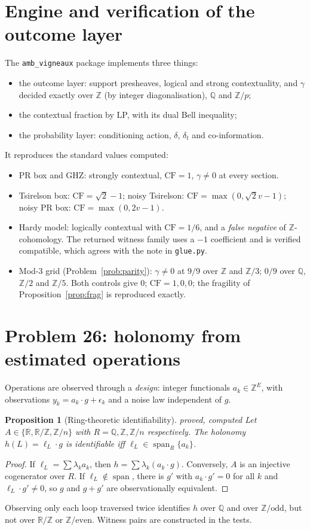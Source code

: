 \documentclass[11pt]{article}
\newtheorem{proposition}[theorem]{Proposition}
\theoremstyle{definition}
\theoremstyle{remark}
\newcommand{\Z}{\mathbb{Z}}
\newcommand{\Q}{\mathbb{Q}}
\newcommand{\R}{\mathbb{R}}
\newcommand{\CF}{\mathrm{CF}}
\newcommand{\st}[1]{\textsf{\small\color{gray}#1}}
\begin{document}
\section{Engine and verification of the outcome layer}\label{sec:engine}
The \texttt{amb\_vigneaux} package implements three things:
\begin{itemize}
  \item the outcome layer: support presheaves, logical and strong contextuality, and $\gamma$ decided exactly over $\Z$ (by integer diagonalisation), $\Q$ and $\Z/p$;
  \item the contextual fraction by LP, with its dual Bell inequality;
  \item the probability layer: conditioning action, $\delta$, $\delta_t$ and co-information.
\end{itemize}
It reproduces the standard values \st{computed}:
\begin{itemize}
  \item PR box and GHZ: strongly contextual, $\CF=1$, $\gamma\ne0$ at every section.
  \item Tsirelson box: $\CF=\sqrt2-1$; noisy Tsirelson: $\CF=\max(0,\sqrt2v-1)$; noisy PR box: $\CF=\max(0,2v-1)$.
  \item Hardy model: logically contextual with $\CF=1/6$, and a \emph{false negative} of $\Z$-cohomology. The returned witness family uses a $-1$ coefficient and is verified compatible, which agrees with the note in \texttt{glue.py}.
  \item Mod-3 grid (Problem~\ref{prob:parity}): $\gamma\ne0$ at $9/9$ over $\Z$ and $\Z/3$; $0/9$ over $\Q$, $\Z/2$ and $\Z/5$. Both controls give $0$; $\CF=1,0,0$; the fragility of Proposition~\ref{prop:frag} is reproduced exactly.
\end{itemize}

\section{Problem 26: holonomy from estimated operations}\label{sec:p26}
Operations are observed through a \emph{design}: integer functionals $a_k\in\Z^E$, with observations $y_k=a_k\cdot g+\epsilon_k$ and a noise law independent of $g$.

\begin{proposition}[Ring-theoretic identifiability]\label{prop:ident}\st{proved, computed}
Let $A\in\{\R,\R/\Z,\Z/n\}$ with $R=\Q,\Z,\Z/n$ respectively. The holonomy $h(L)=\ell_L\cdot g$ is identifiable iff $\ell_L\in\operatorname{span}_R\{a_k\}$.
\end{proposition}
\begin{proof}
If $\ell_L=\sum\lambda_ka_k$, then $h=\sum\lambda_k(a_k\cdot g)$. Conversely, $A$ is an injective cogenerator over $R$. If $\ell_L\notin\operatorname{span}$, there is $g'$ with $a_k\cdot g'=0$ for all $k$ and $\ell_L\cdot g'\ne0$, so $g$ and $g+g'$ are observationally equivalent.
\end{proof}
\noindent Observing only each loop traversed twice identifies $h$ over $\Q$ and over $\Z/\text{odd}$, but not over $\R/\Z$ or $\Z/\text{even}$. Witness pairs are constructed in the tests.
\end{document}
